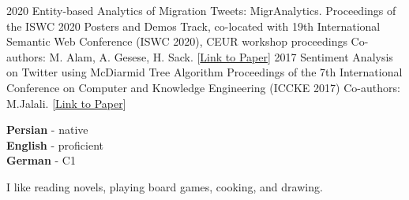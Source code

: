 \documentclass[9pt]{developercv} %
\begin{document}
    \begin{entrylist}
        \entry
        {2020}
        {Entity-based Analytics of Migration Tweets: MigrAnalytics.}
        {Proceedings of the ISWC 2020 Posters and Demos Track, co-located with 19th International Semantic Web Conference (ISWC 2020), CEUR workshop proceedings}
        {Co-authors: M. Alam, A. Gesese, H. Sack. [\href{https://ceur-ws.org/Vol-2721/paper514.pdf}{Link to Paper}]}
        \entry
        {2017}
        {Sentiment Analysis on Twitter using McDiarmid Tree Algorithm}
        {Proceedings of the 7th International Conference on Computer and Knowledge Engineering (ICCKE 2017)}
        {Co-authors: M.Jalali. [\href{https://ieeexplore.ieee.org/document/8167924}{Link to Paper}]}
    \end{entrylist}

	\begin{minipage}[t]{0.3\textwidth}
	    \vspace{-\baselineskip} %


		\textbf{Persian} - native\\
		\textbf{English} - proficient\\
		\textbf{German} - C1
	\end{minipage}
    \hfill
	\begin{minipage}[t]{0.5\textwidth}
	    \vspace{-\baselineskip} %


		I like reading novels, playing board games, cooking, and drawing.
	\end{minipage}
	\hfill
    \vfill

	
\end{document}
